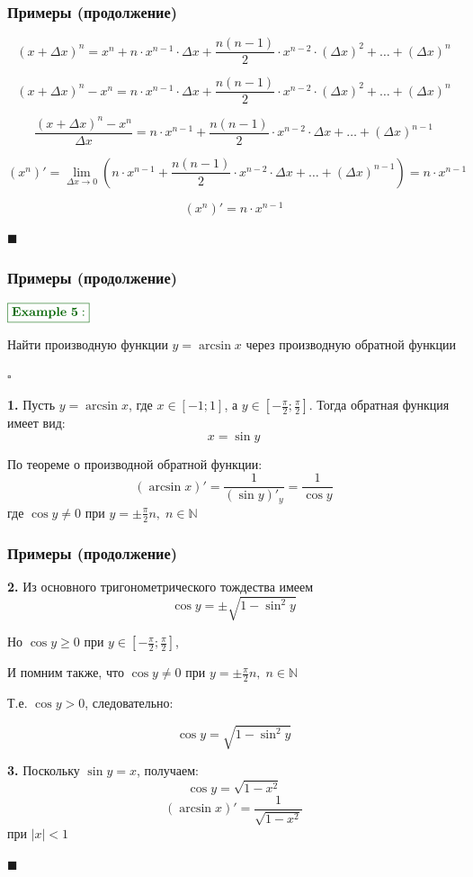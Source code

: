\documentclass[8pt, aspectratio=169]{beamer}
\newcommand{\Ex}[1]{{\color{darkgreen}\boxed{\color{darkgreen}\mathbf{Example~#1:}}}}
\begin{document}
\begin{frame}
\frametitle{Примеры (продолжение)}

$$(x + \Delta x)^n = x^n + n \cdot x^{n-1} \cdot \Delta x + \frac{n(n-1)}{2} \cdot x^{n-2} \cdot (\Delta x)^2 + \dots + (\Delta x)^n$$

$$(x + \Delta x)^n - x^n = n \cdot x^{n-1} \cdot \Delta x + \frac{n(n-1)}{2} \cdot x^{n-2} \cdot (\Delta x)^2 + \dots + (\Delta x)^n$$

$$\frac{(x + \Delta x)^n - x^n}{\Delta x} = n \cdot x^{n-1} + \frac{n(n-1)}{2} \cdot x^{n-2} \cdot \Delta x + \dots + (\Delta x)^{n-1}$$

$$(x^n)' = \lim_{\Delta x \to 0} \left( n \cdot x^{n-1} + \frac{n(n-1)}{2} \cdot x^{n-2} \cdot \Delta x + \dots + (\Delta x)^{n-1} \right) = n \cdot x^{n-1}$$

$$(x^n)' = n \cdot x^{n-1}$$

$\blacksquare$
\end{frame}

\begin{frame}
\frametitle{Примеры (продолжение)}

$\Ex{5}$

Найти производную функции $y = \arcsin x$ через производную обратной функции

$\square$

\textbf{1.} Пусть $y = \arcsin x$, где $x \in [-1; 1]$, а $y \in [-\frac{\pi}{2}; \frac{\pi}{2}]$.
Тогда обратная функция имеет вид:
$$x = \sin y$$

По теореме о производной обратной функции:
$$(\arcsin x)' = \frac{1}{(\sin y)'_y} = \frac{1}{\cos y}$$
где $\cos{y} \ne 0$ при $y = \pm\frac{\pi}{2}n, \; n \in \mathbb{N}$
\end{frame}

\begin{frame}
\frametitle{Примеры (продолжение)}

\textbf{2.} Из основного тригонометрического тождества имеем
$$\cos y = \pm \sqrt{1 - \sin^2 y}$$

Но $\cos y \ge 0$ при $y \in [-\frac{\pi}{2}; \frac{\pi}{2}]$,

И помним также, что $\cos{y} \ne 0$ при $y = \pm\frac{\pi}{2}n, \; n \in \mathbb{N}$

Т.е. $\cos y > 0$, следовательно:

$$\cos y = \sqrt{1 - \sin^2 y}$$

\textbf{3.} Поскольку $\sin y = x$, получаем:
$$\cos y = \sqrt{1 - x^2}$$
$$(\arcsin x)' = \frac{1}{\sqrt{1 - x^2}}$$
при  $|x| < 1$

$\blacksquare$
\end{frame}
\end{document}

